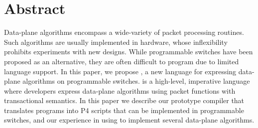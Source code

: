 \section*{Abstract}

Data-plane algorithms encompass a wide-variety of packet processing
routines. Such algorithms are usually
implemented in hardware, whose inflexibility prohibits
experiments with new designs. While programmable switches have been
proposed as an alternative, they are often difficult to program due 
to limited language support. In this paper, we propose \pktlanguage, 
a new language for expressing data-plane algorithms on programmable
switches. \pktlanguage is a high-level, imperative language where 
developers express data-plane algorithms using packet functions with
transactional semantics. In this paper we describe our prototype compiler that
translates \pktlanguage programs into P4 scripts that can be implemented
in programmable switches, and our experience in using \pktlanguage to 
implement several data-plane algorithms. 
